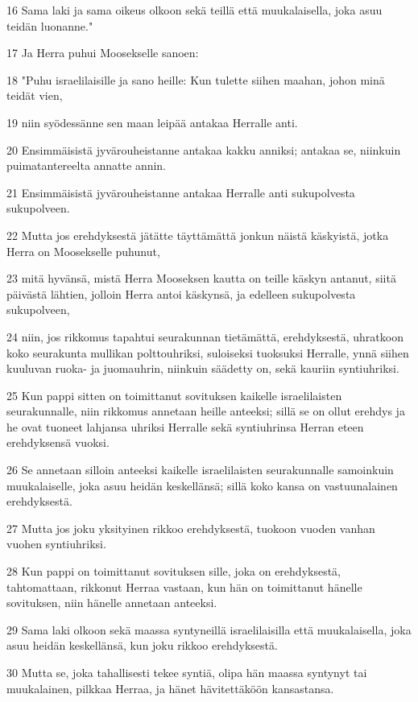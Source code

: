 \par 16 Sama laki ja sama oikeus olkoon sekä teillä että muukalaisella, joka asuu teidän luonanne."
\par 17 Ja Herra puhui Moosekselle sanoen:
\par 18 "Puhu israelilaisille ja sano heille: Kun tulette siihen maahan, johon minä teidät vien,
\par 19 niin syödessänne sen maan leipää antakaa Herralle anti.
\par 20 Ensimmäisistä jyvärouheistanne antakaa kakku anniksi; antakaa se, niinkuin puimatantereelta annatte annin.
\par 21 Ensimmäisistä jyvärouheistanne antakaa Herralle anti sukupolvesta sukupolveen.
\par 22 Mutta jos erehdyksestä jätätte täyttämättä jonkun näistä käskyistä, jotka Herra on Moosekselle puhunut,
\par 23 mitä hyvänsä, mistä Herra Mooseksen kautta on teille käskyn antanut, siitä päivästä lähtien, jolloin Herra antoi käskynsä, ja edelleen sukupolvesta sukupolveen,
\par 24 niin, jos rikkomus tapahtui seurakunnan tietämättä, erehdyksestä, uhratkoon koko seurakunta mullikan polttouhriksi, suloiseksi tuoksuksi Herralle, ynnä siihen kuuluvan ruoka- ja juomauhrin, niinkuin säädetty on, sekä kauriin syntiuhriksi.
\par 25 Kun pappi sitten on toimittanut sovituksen kaikelle israelilaisten seurakunnalle, niin rikkomus annetaan heille anteeksi; sillä se on ollut erehdys ja he ovat tuoneet lahjansa uhriksi Herralle sekä syntiuhrinsa Herran eteen erehdyksensä vuoksi.
\par 26 Se annetaan silloin anteeksi kaikelle israelilaisten seurakunnalle samoinkuin muukalaiselle, joka asuu heidän keskellänsä; sillä koko kansa on vastuunalainen erehdyksestä.
\par 27 Mutta jos joku yksityinen rikkoo erehdyksestä, tuokoon vuoden vanhan vuohen syntiuhriksi.
\par 28 Kun pappi on toimittanut sovituksen sille, joka on erehdyksestä, tahtomattaan, rikkonut Herraa vastaan, kun hän on toimittanut hänelle sovituksen, niin hänelle annetaan anteeksi.
\par 29 Sama laki olkoon sekä maassa syntyneillä israelilaisilla että muukalaisella, joka asuu heidän keskellänsä, kun joku rikkoo erehdyksestä.
\par 30 Mutta se, joka tahallisesti tekee syntiä, olipa hän maassa syntynyt tai muukalainen, pilkkaa Herraa, ja hänet hävitettäköön kansastansa.
